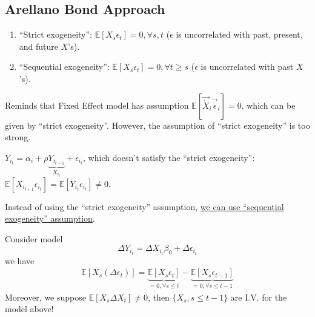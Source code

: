 \documentclass[11pt]{elegantbook}
\begin{document}
\subsection{Arellano Bond Approach}
\begin{enumerate}
    \item ``Strict exogeneity'': $\mathbb{E}[X_{s}\epsilon_{t}]=0, \forall s,t$ ($\epsilon$ is uncorrelated with past, present, and future $X$'s).
    \item ``Sequential exogeneity'': $\mathbb{E}[X_{s}\epsilon_{t}]=0, \forall t\geq s$ ($\epsilon$ is uncorrelated with past  $X$'s).
\end{enumerate}

Reminds that Fixed Effect model has assumption $\mathbb{E}[\vec{\dot{X}}_i \vec{\dot{\epsilon}}_i]=0$, which can be given by ``strict exogeneity''. However, the assumption of ``strict exogeneity'' is too strong.
\begin{example}
    $Y_{i_t}=\alpha_i+\rho \underbrace{Y_{i_{t-1}}}_{X_{i_t}}+\epsilon_{i_t}$, which doesn't satisfy the ``strict exogeneity'': $\mathbb{E}[X_{i_{t+1}}\epsilon_{i_t}]=\mathbb{E}[Y_{i_t}\epsilon_{i_t}]\neq 0$.
\end{example}

Instead of using the ``strict exogeneity'' assumption, \underline{we can use ``sequential exogeneity'' assumption}.

Consider model $$\Delta Y_{i_t}=\Delta X_{i_t}\beta_0+\Delta \epsilon_{i_t}$$
we have
\begin{equation}
    \begin{aligned}
        \mathbb{E}[X_s(\Delta\epsilon_t)]=\underbrace{\mathbb{E}[X_s\epsilon_t]}_{=0,\forall s\leq t}-\underbrace{\mathbb{E}[X_s\epsilon_{t-1}]}_{=0,\forall s\leq t-1}
    \end{aligned}
    \nonumber
\end{equation}
Moreover, we suppose $ \mathbb{E}[X_s\Delta X_t]\neq 0$, then $\{X_s,s\leq t-1\}$ are I.V. for the model above!
\end{document}
